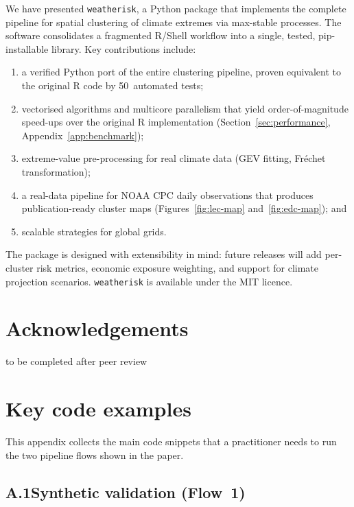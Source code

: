 \documentclass[preprint,12pt,a4paper]{elsarticle}
\begin{document}
We have presented \texttt{weatherisk}, a Python package that
implements the complete pipeline for spatial clustering of climate
extremes via max-stable processes.  The software consolidates a
fragmented R/Shell workflow into a single, tested, pip-installable
library.  Key contributions include:
\begin{enumerate}
\item a verified Python port of the entire clustering pipeline,
  proven equivalent to the original R code by 50~automated tests;
\item vectorised algorithms and multicore parallelism that yield
  order-of-magnitude speed-ups over the original R implementation
  (Section~\ref{sec:performance}, Appendix~\ref{app:benchmark});
\item extreme-value pre-processing for real climate data (GEV
  fitting, Fr\'{e}chet transformation);
\item a real-data pipeline for NOAA CPC daily observations that
  produces publication-ready cluster maps
  (Figures~\ref{fig:lec-map} and~\ref{fig:edc-map}); and
\item scalable strategies for global grids.
\end{enumerate}
The package is designed with extensibility in mind: future releases
will add per-cluster risk metrics, economic exposure weighting, and
support for climate projection scenarios.  \texttt{weatherisk} is
available under the MIT licence.

\section*{Acknowledgements}

to be completed after peer review

\appendix

\section{Key code examples}
\label{app:code}

This appendix collects the main code snippets that a practitioner
needs to run the two pipeline flows shown in the paper.

\subsection{A.1\quad Synthetic validation (Flow~1)}
\end{document}
